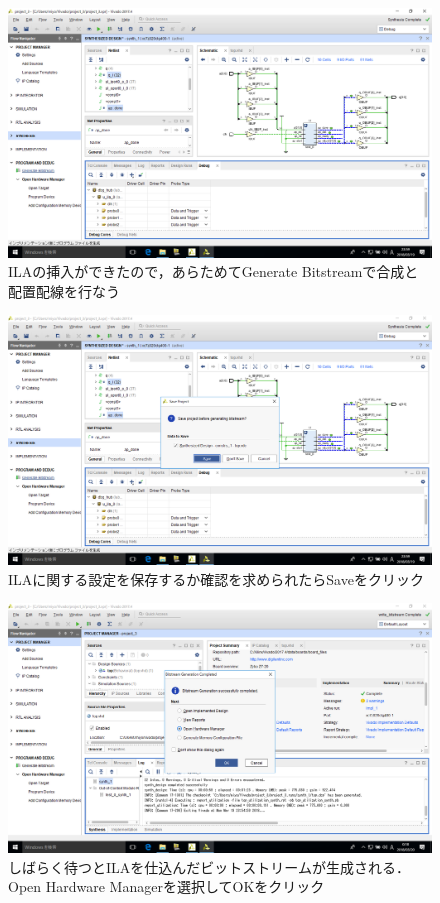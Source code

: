 \documentclass[a4paper,dvipdfmx]{jsarticle}
\begin{document}
 \begin{figure}[H]
  \begin{center}
   \includegraphics[width=.8\textwidth]{chapter08_figures/VirtualBox_Windows10_19_03_2018_23_59_22.png}
  \end{center}
  \caption{ILAの挿入ができたので，あらためてGenerate Bitstreamで合成と配置配線を行なう}
 \end{figure}

 \begin{figure}[H]
  \begin{center}
   \includegraphics[width=.8\textwidth]{chapter08_figures/VirtualBox_Windows10_19_03_2018_23_59_29.png}
  \end{center}
  \caption{ILAに関する設定を保存するか確認を求められたらSaveをクリック}
 \end{figure}

 \begin{figure}[H]
  \begin{center}
   \includegraphics[width=.8\textwidth]{chapter08_figures/VirtualBox_Windows10_20_03_2018_00_20_08.png}
  \end{center}
  \caption{しばらく待つとILAを仕込んだビットストリームが生成される．Open Hardware Managerを選択してOKをクリック}
 \end{figure}
\end{document}
